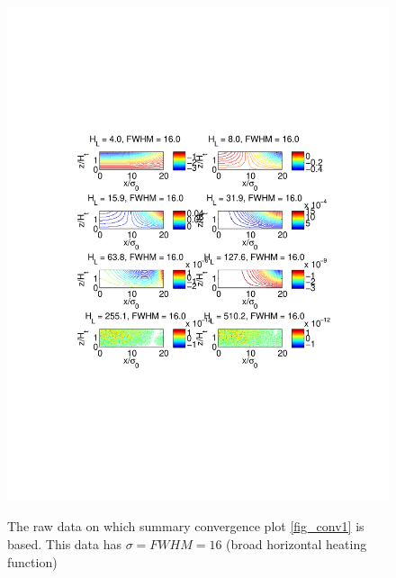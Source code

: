 \documentclass[12pt]{article}
\begin{document}
\begin{figure}[h]
\caption{The raw data on which summary convergence plot \ref{fig_conv1} is based. This data has $\sigma=FWHM=16$ (broad horizontal heating function) } 
\includegraphics[scale=0.8,angle=-0] {fig4c.pdf} 
\label{fig_conv3}
\end{figure}
%
%
%
%
%
%
\end{document}
